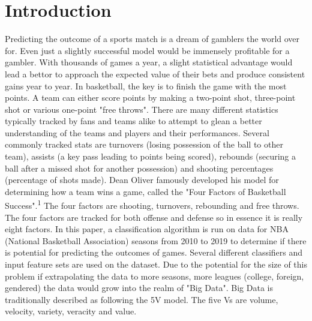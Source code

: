 \documentclass[12pt]{article}%
\begin{document}
\section{Introduction}
Predicting the outcome of a sports match is a dream of gamblers the world over for. Even just a slightly successful model would be immensely profitable for a gambler. With thousands of games a year, a slight statistical advantage would lead a bettor to approach the expected value of their bets and produce consistent gains year to year.
\newline\newline
In basketball, the key is to finish the game with the most points. A team can either score points by making a two-point shot, three-point shot or various one-point "free throws". There are many different statistics typically tracked by fans and teams alike to attempt to glean a better understanding of the teams and players and their performances. Several commonly tracked stats are turnovers (losing possession of the ball to other team), assists (a key pass leading to points being scored), rebounds (securing a ball after a missed shot for another possession) and shooting percentages (percentage of shots made). Dean Oliver famously developed his model for determining how a team wins a game, called the "Four Factors of Basketball Success".\textsuperscript{1} The four factors are shooting, turnovers, rebounding and free throws. The four factors are tracked for both offense and defense so in essence it is really eight factors.
\newline\newline
In this paper, a classification algorithm is run on data for NBA (National Basketball Association) seasons from 2010 to 2019 to determine if there is potential for predicting the outcomes of games. Several different classifiers and input feature sets are used on the dataset.
\newline\newline
Due to the potential for the size of this problem if extrapolating the data to more seasons, more leagues (college, foreign, gendered) the data would grow into the realm of "Big Data". Big Data is traditionally described as following the 5V model. The five Vs are volume, velocity, variety, veracity and value.
\newline\newline
\end{document}

